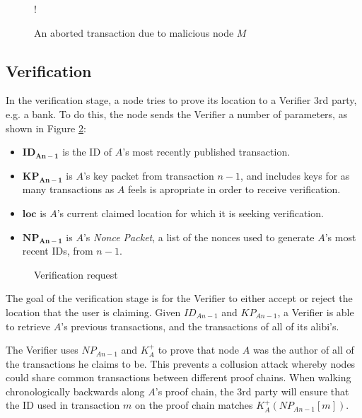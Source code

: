 \documentclass[12pt]{article}
\begin{document}
\begin{figure}[h]
\resizebox {\columnwidth} {!} {}
\caption{An aborted transaction due to malicious node $M$}
\label{fig:aborted_transaction}
\end{figure}

\subsection{Verification}
\begin{minipage}{0.5\linewidth}
In the verification stage, a node tries to prove its location to a Verifier 3rd party, e.g. a bank. To do this, the node sends the Verifier a number of parameters, as shown in Figure \ref{fig:verify_request}:
\begin{itemize}[noitemsep,topsep=0pt]
	\item[] $\mathbf{ID_{An-1}}$ is the ID of $A$'s most recently published transaction.
	\item[] $\mathbf{KP_{An-1}}$ is $A$'s key packet from transaction $n-1$, and includes keys for as many transactions as $A$ feels is apropriate in order to receive verification.
	\item[] $\mathbf{loc}$ is $A$'s current claimed location for which it is seeking verification.
	\item[] $\mathbf{NP_{An-1}}$ is $A$'s \textit{Nonce Packet}, a list of the nonces used to generate $A$'s most recent IDs, from $n-1$.	
\end{itemize}
\end{minipage}
\hfill
\begin{minipage}[c]{0.5\linewidth}
\begin{figure}[H]

\caption{Verification request}
\label{fig:verify_request}
\end{figure}
\end{minipage}


The goal of the verification stage is for the Verifier to either accept or reject the location that the user is claiming. Given $ID_{An-1}$ and $KP_{An-1}$, a Verifier is able to retrieve $A$'s previous transactions, and the transactions of all of its alibi's.

The Verifier uses $NP_{An-1}$ and $K^{+}_A$ to prove that node $A$ was the author of all of the transactions he claims to be. This prevents a collusion attack whereby nodes could share common transactions between different proof chains. When walking chronologically backwards along $A$'s proof chain, the 3rd party will ensure that the ID used in transaction $m$ on the proof chain matches $K^{+}_A(NP_{An-1}[m])$.
\end{document}
